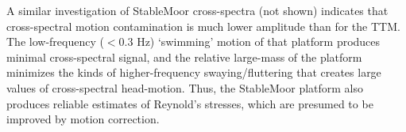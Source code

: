 A similar investigation of StableMoor cross-spectra (not shown) indicates that cross-spectral motion contamination is much lower amplitude than for the TTM. The low-frequency ($<0.3$ Hz) `swimming' motion of that platform produces minimal cross-spectral signal, and the relative large-mass of the platform minimizes the kinds of higher-frequency swaying/fluttering that creates large values of cross-spectral head-motion. Thus, the StableMoor platform also produces reliable estimates of Reynold's stresses, which are presumed to be improved by motion correction.





